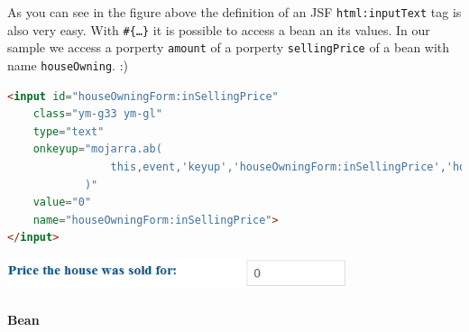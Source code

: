 As you can see in the figure above the definition of an JSF
\texttt{html:inputText} tag is also very easy. With \texttt{\#\{\ldots\}} it is
possible to access a bean an its values. In our sample we access a porperty
\texttt{amount} of a porperty \texttt{sellingPrice} of a bean with name
\texttt{houseOwning}. :)

\begin{lstlisting}[language=HTML]
<input id="houseOwningForm:inSellingPrice" 
	class="ym-g33 ym-gl" 
	type="text"
	onkeyup="mojarra.ab(
				this,event,'keyup','houseOwningForm:inSellingPrice','houseOwningForm:grp_ValueReside'
			)"
	value="0" 
	name="houseOwningForm:inSellingPrice">
</input>
\end{lstlisting}

\begin{center}
 \includegraphics[width=10cm]{./images/chapter02/referenceimpl_forms_text.png}
\end{center}

\paragraph{Bean}





